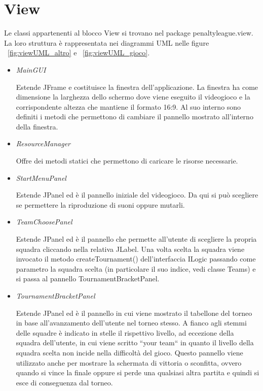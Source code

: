 \documentclass[12pt,a4paper]{report}
\begin{document}
\section{View}\label{se:arch.view}
Le classi appartenenti al blocco View si trovano nel package
penaltyleague.view. La loro struttura è rappresentata nei diagrammi UML nelle
figure ~\ref{fig:viewUML_altro} e ~\ref{fig:viewUML_gioco}.\newline
\begin{itemize}
\item\emph{MainGUI}

Estende JFrame e costituisce la finestra dell'applicazione. La finestra ha come dimensione la larghezza dello schermo dove viene eseguito il videogioco e la corrispondente altezza che mantiene il formato 16:9. 
Al suo interno sono definiti i metodi che permettono di cambiare il pannello mostrato all'interno della finestra.

\item\emph{ResourceManager}

Offre dei metodi statici che permettono di caricare le risorse necessarie.

\item\emph{StartMenuPanel}

Estende JPanel ed è il pannello iniziale del videogioco. Da qui si può scegliere se permettere la riproduzione di suoni oppure mutarli.

\item\emph{TeamChoosePanel}

Estende JPanel ed è il pannello che permette all'utente di scegliere la propria squadra cliccando nella relativa JLabel. Una volta scelta la squadra viene invocato il metodo createTournament() dell'interfaccia ILogic passando come parametro la squadra scelta (in particolare il suo indice, vedi classe Teams) e si passa al pannello TournamentBracketPanel.

\item\emph{TournamentBracketPanel}

Estende JPanel ed è il pannello in cui viene mostrato il tabellone del torneo in base all'avanzamento dell'utente nel torneo stesso. A fianco agli stemmi delle squadre è indicato in stelle il rispettivo livello, ad eccezione della squadra dell’utente, in cui viene scritto ``your team`` in quanto il livello della squadra scelta non incide nella difficoltà del gioco.
Questo pannello viene utilizzato anche per mostrare la schermata di vittoria o sconfitta, ovvero quando si vince la finale oppure si perde una qualsiasi altra partita e quindi si esce di conseguenza dal torneo.


\end{itemize}
\end{document}
